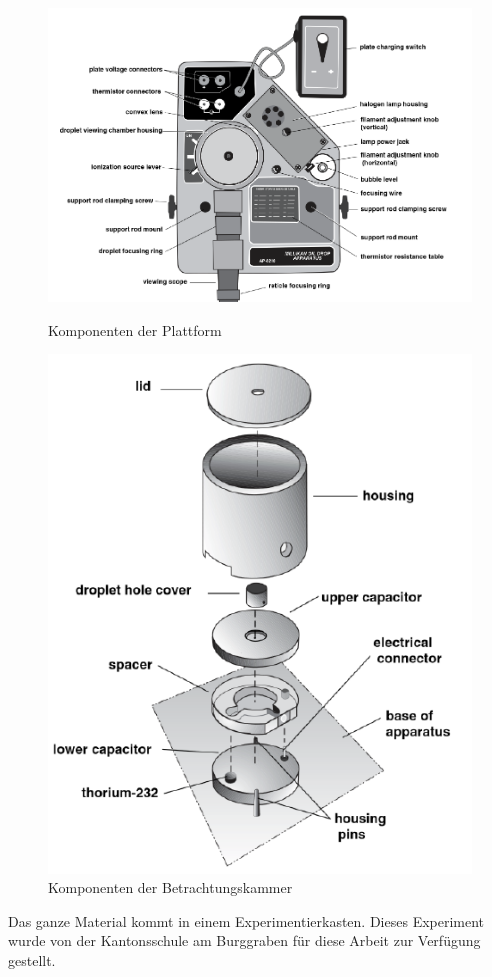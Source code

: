 \begin{figure}[h]
	\centering
	\begin{minipage}[t]{0.45\textwidth}
		\centering
		\includegraphics[scale=0.5]{bilder/pdf/plattformKomponenten.pdf}
		\caption{Komponenten der Plattform}
		\label{fig:plattformKomp}
	\end{minipage}
	\hfill
	\begin{minipage}[t]{0.45\textwidth}
		\centering
		\includegraphics[width=\textwidth]{bilder/pdf/BetrachtungsKammerKomponenten.pdf}
		\caption{Komponenten der Betrachtungskammer}
		\label{fig:betrachtKomp}
	\end{minipage}
\end{figure}

Das ganze Material kommt in einem Experimentierkasten. Dieses Experiment wurde von der Kantonsschule am Burggraben für diese Arbeit zur Verfügung gestellt.





